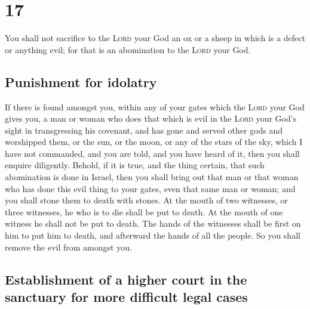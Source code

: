 \hypertarget{section-16}{%
\section{17}\label{section-16}}

 You shall not sacrifice to the \textsc{Lord} your God an
ox or a sheep in which is a defect or anything evil; for that is an
abomination to the \textsc{Lord} your God.

\hypertarget{punishment-for-idolatry}{%
\subsection{Punishment for idolatry}\label{punishment-for-idolatry}}

 If there is found amongst you, within any of your gates
which the \textsc{Lord} your God gives you, a man or woman who does that
which is evil in the \textsc{Lord} your God's sight in transgressing his
covenant,  and has gone and served other gods and
worshipped them, or the sun, or the moon, or any of the stars of the
sky, which I have not commanded,  and you are told, and
you have heard of it, then you shall enquire diligently. Behold, if it
is true, and the thing certain, that such abomination is done in Israel,
 then you shall bring out that man or that woman who has
done this evil thing to your gates, even that same man or woman; and you
shall stone them to death with stones.  At the mouth of
two witnesses, or three witnesses, he who is to die shall be put to
death. At the mouth of one witness he shall not be put to death.
 The hands of the witnesses shall be first on him to put
him to death, and afterward the hands of all the people. So you shall
remove the evil from amongst you.

\hypertarget{establishment-of-a-higher-court-in-the-sanctuary-for-more-difficult-legal-cases}{%
\subsection{Establishment of a higher court in the sanctuary for more
difficult legal
cases}\label{establishment-of-a-higher-court-in-the-sanctuary-for-more-difficult-legal-cases}}

